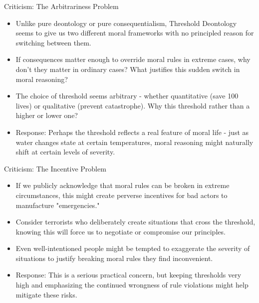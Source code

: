 \documentclass{beamer}
\begin{document}
\begin{frame}{Criticism: The Arbitrariness Problem}
\begin{itemize}
    \item Unlike pure deontology or pure consequentialism, Threshold Deontology seems to give us two different moral frameworks with no principled reason for switching between them.
    
    \item If consequences matter enough to override moral rules in extreme cases, why don't they matter in ordinary cases? What justifies this sudden switch in moral reasoning?
    
    \item The choice of threshold seems arbitrary - whether quantitative (save 100 lives) or qualitative (prevent catastrophe). Why this threshold rather than a higher or lower one?
    
    \item Response: Perhaps the threshold reflects a real feature of moral life - just as water changes state at certain temperatures, moral reasoning might naturally shift at certain levels of severity.
\end{itemize}
\end{frame}

\begin{frame}{Criticism: The Incentive Problem}
\begin{itemize}
    \item If we publicly acknowledge that moral rules can be broken in extreme circumstances, this might create perverse incentives for bad actors to manufacture "emergencies."
    
    \item Consider terrorists who deliberately create situations that cross the threshold, knowing this will force us to negotiate or compromise our principles.
    
    \item Even well-intentioned people might be tempted to exaggerate the severity of situations to justify breaking moral rules they find inconvenient.
    
    \item Response: This is a serious practical concern, but keeping thresholds very high and emphasizing the continued wrongness of rule violations might help mitigate these risks.
\end{itemize}
\end{frame}
\end{document}
